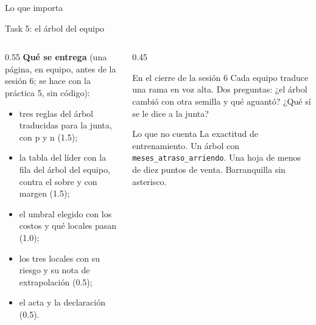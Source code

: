 \documentclass{beamer}
\begin{document}
\begin{frame}{Lo que importa}
\end{frame}

\begin{frame}{Task 5: el árbol del equipo}
\begin{columns}[T]
\begin{column}{0.55\textwidth}
\textbf{Qué se entrega} (una página, en equipo, antes de la sesión 6; se hace con la práctica 5, sin código):
\begin{itemize}\itemsep3pt
  \item tres reglas del árbol traducidas para la junta, con p y n (1.5);
  \item la tabla del líder con la fila del árbol del equipo, contra el sobre y con margen (1.5);
  \item el umbral elegido con los costos y qué locales pasan (1.0);
  \item los tres locales con su riesgo y su nota de extrapolación (0.5);
  \item el acta y la declaración (0.5).
\end{itemize}
\end{column}
\begin{column}{0.45\textwidth}
\begin{exampleblock}{En el cierre de la sesión 6}
Cada equipo traduce una rama en voz alta. Dos preguntas: ¿el árbol cambió con otra semilla y qué aguantó? ¿Qué sí se le dice a la junta?
\end{exampleblock}
\begin{alertblock}{Lo que no cuenta}
La exactitud de entrenamiento. Un árbol con \texttt{meses\_atraso\_arriendo}. Una hoja de menos de diez puntos de venta. Barranquilla sin asterisco.
\end{alertblock}
\end{column}
\end{columns}
\end{frame}
\end{document}

